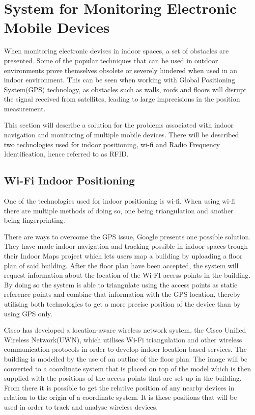 \section{System for Monitoring Electronic Mobile Devices}\label{sec:monitoring}
When monitoring electronic devises in indoor spaces, a set of obstacles are presented. Some of the popular techniques that can be used in outdoor environments prove themselves obsolete or severely hindered when used in an indoor environment. This can be seen when working with Global Positioning System(GPS) technology, as obstacles such as walls, roofs and floors will disrupt the signal received from satellites, leading to large imprecisions in the position measurement.

This section will describe a solution for the problems associated with indoor navigation and monitoring of multiple mobile devices. There will be described two technologies used for indoor positioning, wi-fi and Radio Frequency Identification, hence referred to as RFID.

\subsection{Wi-Fi Indoor Positioning}
One of the technologies used for indoor positioning is wi-fi. When using wi-fi there are multiple methods of doing so, one being triangulation and another being fingerprinting.

There are ways to overcome the GPS issue, Google presents one possible solution. They have made indoor navigation and tracking possible in indoor spaces trough their Indoor Maps project \cite{IPSoverGPS} which lets users map a building by uploading a floor plan of said building. After the floor plan have been accepted, the system will request information about the location of the Wi-FI access points in the building. By doing so the system is able to triangulate using the access points as static reference points and combine that information with the GPS location, thereby utilising both technologies to get a more precise position of the device than by using GPS only.

Cisco has developed a location-aware wireless network system, the Cisco Unified Wireless Network(UWN), which utilises Wi-Fi triangulation\cite{CiscoTri} and other wireless communication protocols in order to develop indoor location based services\cite{uwn}. 
The building is modelled by the use of an outline of the floor plan. The image will be converted to a coordinate system that is placed on top of the model which is then supplied with the positions of the access points that are set up in the building. From there it is possible to get the relative position of any nearby devices in relation to the origin of a coordinate system. It is these positions that will be used in order to track and analyse wireless devices.


